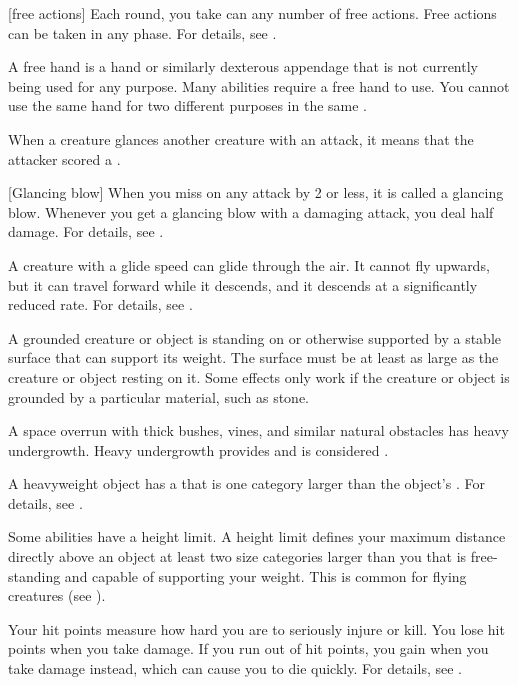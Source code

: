 [free actions] Each round, you take can any number of free actions.
Free actions can be taken in any phase.
For details, see .

 A free hand is a hand or similarly dexterous appendage that is not currently being used for any purpose.
Many abilities require a free hand to use.
You cannot use the same hand for two different purposes in the same .

 When a creature glances another creature with an attack, it means that the attacker scored a .

[Glancing blow] When you miss on any attack by 2 or less, it is called a glancing blow.
Whenever you get a glancing blow with a damaging attack, you deal half damage.
For details, see .

 A creature with a glide speed can glide through the air.
It cannot fly upwards, but it can travel forward while it descends, and it descends at a significantly reduced rate.
For details, see .

 A grounded creature or object is standing on or otherwise supported by a stable surface that can support its weight.
The surface must be at least as large as the creature or object resting on it.
Some effects only work if the creature or object is grounded by a particular material, such as stone. 

 A space overrun with thick bushes, vines, and similar natural obstacles has heavy undergrowth.
Heavy undergrowth provides  and is considered .

 A heavyweight object has a  that is one category larger than the object's .
For details, see .

 Some abilities have a height limit.
A height limit defines your maximum distance directly above an object at least two size categories larger than you that is free-standing and capable of supporting your weight.
This is common for flying creatures (see ).

 Your hit points measure how hard you are to seriously injure or kill.
You lose hit points when you take damage.
If you run out of hit points, you gain  when you take damage instead, which can cause you to die quickly.
For details, see .

